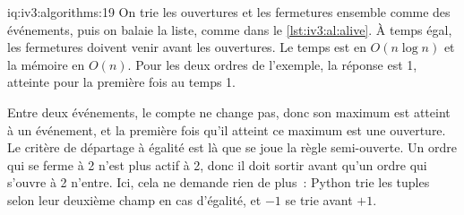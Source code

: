 \begin{solution}{iq:iv3:algorithms:19}
On trie les ouvertures et les fermetures ensemble comme des événements, puis on balaie la liste, comme dans le \cref{lst:iv3:al:alive}. À temps égal, les fermetures doivent venir avant les ouvertures. Le temps est en $O(n \log n)$ et la mémoire en $O(n)$. Pour les deux ordres de l'exemple, la réponse est 1, atteinte pour la première fois au temps 1.
\label{lst:iv3:al:alive}

Entre deux événements, le compte ne change pas, donc son maximum est atteint à un événement, et la première fois qu'il atteint ce maximum est une ouverture. Le critère de départage à égalité est là que se joue la règle semi-ouverte. Un ordre qui se ferme à 2 n'est plus actif à 2, donc il doit sortir avant qu'un ordre qui s'ouvre à 2 n'entre. Ici, cela ne demande rien de plus~: Python trie les tuples selon leur deuxième champ en cas d'égalité, et $-1$ se trie avant $+1$.

\end{solution}

